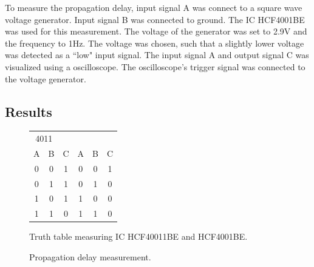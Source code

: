 \documentclass[journal]{IEEEtran}
\begin{document}
To measure the propagation delay, input signal A was connect to a square wave
voltage generator. Input signal B was connected to ground. The IC HCF4001BE
was used for this measurement. The voltage of the generator was set to 2.9V and
the frequency to 1Hz. The voltage was chosen, such that a slightly lower
voltage was detected as a ``low" input signal. The input signal A and output
signal C was visualized using a oscilloscope. The oscilloscope's trigger signal was connected to the voltage generator.

\subsection{Results}

\begin{figure}
	\centering
	\begin{tabular}{c c | c || c c | c}
 		 \multicolumn{2}{c}{4011}
  		 \multicolumn{5}{c}{4001} \\
		  A & B & C & A & B & C \\ \hline
		  0 & 0 & 1 & 0 & 0 & 1 \\
		  0 & 1 & 1 & 0 & 1 & 0 \\
		  1 & 0 & 1 & 1 & 0 & 0 \\
		  1 & 1 & 0 & 1 & 1 & 0 \\
	\end{tabular}
	\caption{Truth table measuring IC HCF40011BE and HCF4001BE.}
	\label{tab:truthtable} 
\end{figure}

 \begin{figure}
   \centering
  \caption{Propagation delay measurement.}
  \label{fig:propdelay}
\end{figure}
\end{document}
